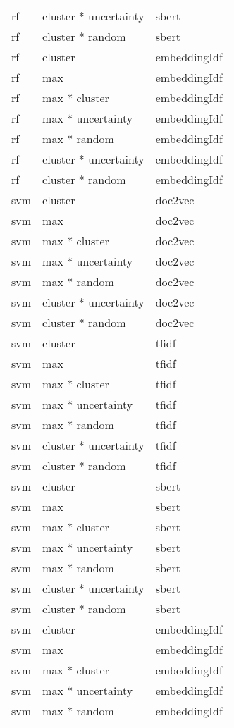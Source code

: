 \documentclass[
]{article}
\begin{document}
\begin{longtable}{lll}
rf & cluster * uncertainty & sbert\\
\addlinespace
rf & cluster * random & sbert\\
rf & cluster & embeddingIdf\\
rf & max & embeddingIdf\\
rf & max * cluster & embeddingIdf\\
rf & max * uncertainty & embeddingIdf\\
\addlinespace
rf & max * random & embeddingIdf\\
rf & cluster * uncertainty & embeddingIdf\\
rf & cluster * random & embeddingIdf\\
svm & cluster & doc2vec\\
svm & max & doc2vec\\
\addlinespace
svm & max * cluster & doc2vec\\
svm & max * uncertainty & doc2vec\\
svm & max * random & doc2vec\\
svm & cluster * uncertainty & doc2vec\\
svm & cluster * random & doc2vec\\
\addlinespace
svm & cluster & tfidf\\
svm & max & tfidf\\
svm & max * cluster & tfidf\\
svm & max * uncertainty & tfidf\\
svm & max * random & tfidf\\
\addlinespace
svm & cluster * uncertainty & tfidf\\
svm & cluster * random & tfidf\\
svm & cluster & sbert\\
svm & max & sbert\\
svm & max * cluster & sbert\\
\addlinespace
svm & max * uncertainty & sbert\\
svm & max * random & sbert\\
svm & cluster * uncertainty & sbert\\
svm & cluster * random & sbert\\
svm & cluster & embeddingIdf\\
\addlinespace
svm & max & embeddingIdf\\
svm & max * cluster & embeddingIdf\\
svm & max * uncertainty & embeddingIdf\\
svm & max * random & embeddingIdf\\

\end{longtable}
\end{document}
